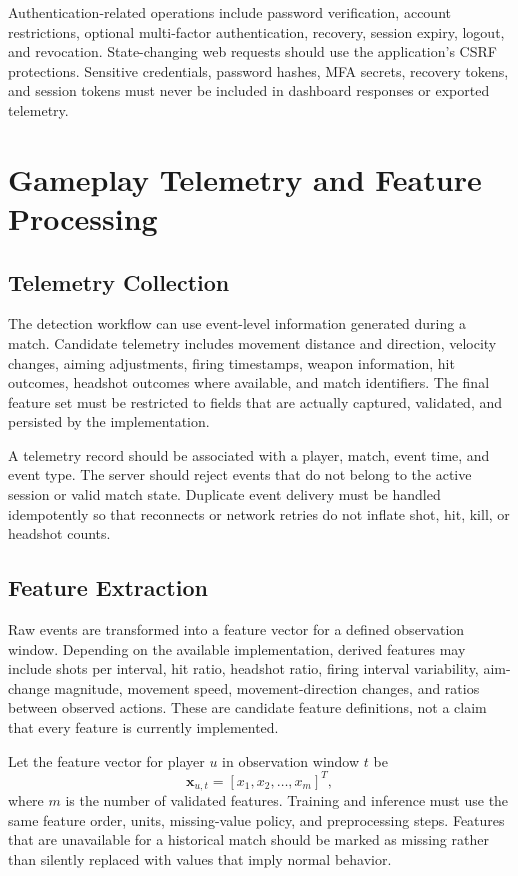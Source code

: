 \documentclass[conference]{IEEEtran}
\begin{document}
Authentication-related operations include password verification, account restrictions, optional multi-factor authentication, recovery, session expiry, logout, and revocation. State-changing web requests should use the application's CSRF protections. Sensitive credentials, password hashes, MFA secrets, recovery tokens, and session tokens must never be included in dashboard responses or exported telemetry.

\section{Gameplay Telemetry and Feature Processing}
\subsection{Telemetry Collection}
The detection workflow can use event-level information generated during a match. Candidate telemetry includes movement distance and direction, velocity changes, aiming adjustments, firing timestamps, weapon information, hit outcomes, headshot outcomes where available, and match identifiers. The final feature set must be restricted to fields that are actually captured, validated, and persisted by the implementation.

A telemetry record should be associated with a player, match, event time, and event type. The server should reject events that do not belong to the active session or valid match state. Duplicate event delivery must be handled idempotently so that reconnects or network retries do not inflate shot, hit, kill, or headshot counts.

\subsection{Feature Extraction}
Raw events are transformed into a feature vector for a defined observation window. Depending on the available implementation, derived features may include shots per interval, hit ratio, headshot ratio, firing interval variability, aim-change magnitude, movement speed, movement-direction changes, and ratios between observed actions. These are candidate feature definitions, not a claim that every feature is currently implemented.

Let the feature vector for player $u$ in observation window $t$ be
\begin{equation}
\mathbf{x}_{u,t}=[x_1,x_2,\ldots,x_m]^T,
\label{eq:featurevector}
\end{equation}
where $m$ is the number of validated features. Training and inference must use the same feature order, units, missing-value policy, and preprocessing steps. Features that are unavailable for a historical match should be marked as missing rather than silently replaced with values that imply normal behavior.
\end{document}

